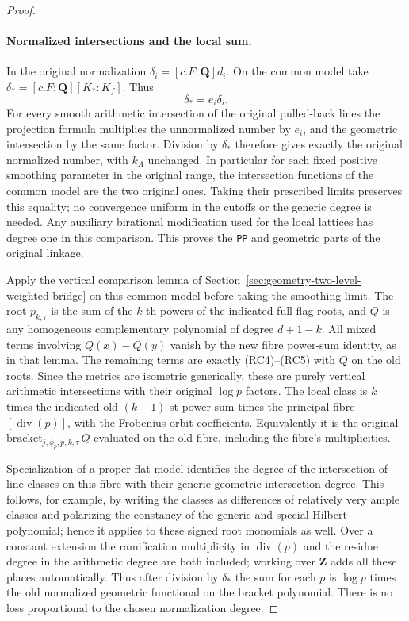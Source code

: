 \begin{proof}
\paragraph{Normalized intersections and the local sum.}
In the original normalization \(\delta_i=[c.F:\mathbf Q]d_i\).
On the common model take \(\delta_*=[c.F:\mathbf Q][K_*:K_f]\).
Thus
\[
                       \delta_*=e_i\delta_i .
\]
For every smooth arithmetic intersection of the original
pulled-back lines the projection formula multiplies the
unnormalized number by \(e_i\), and the geometric
intersection by the same factor. Division by \(\delta_*\)
therefore gives exactly the original normalized number,
with \(k_A\) unchanged. In particular for each fixed
positive smoothing parameter in the original range, the
intersection functions of the common model are the two
original ones. Taking their prescribed limits preserves
this equality; no convergence uniform in the cutoffs or
the generic degree is needed. Any auxiliary birational
modification used for the local lattices has degree one
in this comparison. This proves the \texttt{PP} and
geometric parts of the original linkage.

Apply the vertical comparison lemma of
Section~\ref{sec:geometry-two-level-weighted-bridge} on
this common model before taking the smoothing limit.
The root \(p_{k,\tau}\) is the sum of the \(k\)-th
powers of the indicated full flag roots, and \(Q\) is
any homogeneous complementary polynomial of degree \(d+1-k\).
All mixed terms involving \(Q(x)-Q(y)\) vanish by the
new fibre power-sum identity, as in that lemma.
The remaining terms are exactly (RC4)--(RC5) with
\(Q\) on the old roots. Since the metrics are isometric
generically, these are purely vertical arithmetic
intersections with their original \(\log p\) factors.
The local class is \(k\) times the indicated old
\((k-1)\)-st power sum times the principal fibre
\([\operatorname{div}(p)]\), with the Frobenius orbit
coefficients. Equivalently it is the original
\(\mathrm{bracket}_{j,\phi_p,p,k,\tau}\,Q\) evaluated on
the old fibre, including the fibre's multiplicities.

Specialization of a proper flat model identifies the
degree of the intersection of line classes on this fibre
with their generic geometric intersection degree.
This follows, for example, by writing the classes as
differences of relatively very ample classes and
polarizing the constancy of the generic and special
Hilbert polynomial; hence it applies to these signed
root monomials as well. Over a constant extension the
ramification multiplicity in \(\operatorname{div}(p)\)
and the residue degree in the arithmetic degree are both
included; working over \(\mathbf Z\) adds all these
places automatically. Thus after division by
\(\delta_*\) the sum for each \(p\) is
\(\log p\) times the old normalized geometric functional
on the bracket polynomial. There is no loss proportional
to the chosen normalization degree.


\end{proof}
